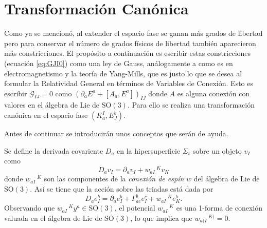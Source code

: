\section{Transformaci\'{o}n Can\'{o}nica}

Como ya se mencion\'{o}, al extender el espacio fase se ganan m\'{a}s grados de libertad pero para conservar el n\'{u}mero de grados f\'{i}sicos de libertad tambi\'{e}n aparecieron m\'{a}s constricciones. El prop\'{o}sito a continuaci\'{o}n es escribir estas constricciones (ecuaci\'{o}n \eqref{eq:GJI0}) como una ley de Gauss, an\'{a}logamente a como es en electromagnetismo y la teor\'{i}a de Yang-Mills, que es justo lo que se desea al formular la Relatividad General en t\'{e}rminos de Variables de Conexi\'{o}n. Esto es escribir $\mathcal{G}_{IJ} = 0$ como $(\partial_{a} E^{a} + [A_{a}, E^{a}])_{IJ}$ donde $A$ es alguna conexi\'{o}n con valores en el \'{a}lgebra de Lie de $\mathrm{SO}(3)$. Para ello se realiza una transformaci\'{o}n can\'{o}nica en el espacio fase $(K^{I}_{a}, E^{b}_{J})$.

Antes de continuar se introducir\'{a}n unos conceptos que ser\'{a}n de ayuda.

Se define la derivada covariente $D_{a}$ en la hipersuperficie $\Sigma_{t}$ sobre un objeto $v_{I}$ como
%
\begin{equation}
D_{a} v_{I} = \partial_{a} v_{I} + w_{aI}\,^{K} v_{K}
\end{equation}
%
donde $w_{aI}\,^{K}$ son las componentes de la \emph{conexi\'{o}n de esp\'{i}n} $w$ del \'{a}lgebra de Lie de $\mathrm{SO}(3)$. As\'{i} se tiene que la acci\'{o}n sobre las triadas est\'{a} dada por
%
\begin{equation}
\label{eq:DaebI}
D_{a} e^{b}_{I} = \partial_{a} e^{b}_{I} + \Gamma^{b}_{ac} e^{c}_{I} + w_{aI}\,^{K} e^{b}_{K}.
\end{equation}
%
Observando que $w_{aI}\,^{K} y^{a} \in \mathrm{SO}(3)$, el potencial $w_{aI}\,^{K}$ es una 1-forma de conexi\'{o}n valuada en el \'{a}lgebra de Lie de $\mathrm{SO}(3)$, lo que implica que $w_{a(I}\,^{K)} = 0$.

